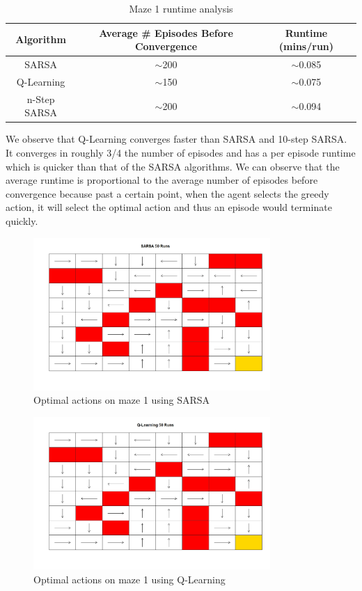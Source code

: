 \documentclass[final,12pt,3p]{elsarticle}
\begin{document}
\begin{table}[H]
    \centering
    \caption{Maze 1 runtime analysis}
    \begin{tabular}{|c|c|c|}
        \hline
        \textbf{Algorithm} & \textbf{Average \# Episodes Before Convergence} & \textbf{Runtime (mins/run)} \\ \hline
        SARSA & $\sim$200 & $\sim$0.085 \\ \hline
        Q-Learning & $\sim$150 & $\sim$0.075 \\ \hline
        n-Step SARSA & $\sim$200 & $\sim$0.094 \\ \hline
    \end{tabular}
\end{table}

We observe that Q-Learning converges faster than SARSA and 10-step SARSA. It converges in roughly 3/4 the number of episodes and has a per episode runtime which is quicker than that of the SARSA algorithms. We can observe that the average runtime is proportional to the average number of episodes before convergence because past a certain point, when the agent selects the greedy action, it will select the optimal action and thus an episode would terminate quickly.

\begin{figure}[H]
    \centering
    \caption{Optimal actions on maze 1 using SARSA}
    \includegraphics[width=9cm]{figures/Maps/Maze1/SARSAMapMaze1.jpeg}
\end{figure}

\begin{figure}[H]
    \centering
    \caption{Optimal actions on maze 1 using Q-Learning}
    \includegraphics[width=9cm]{figures/Maps/Maze1/QLearningMapMaze1.jpeg}
\end{figure}
\end{document}

